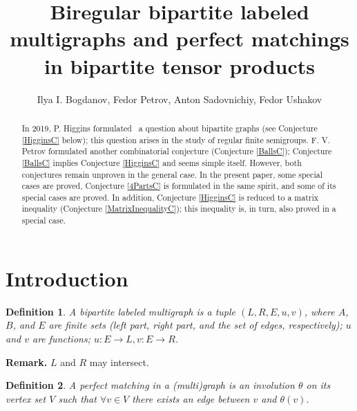 \documentclass[12pt]{article}
\theoremstyle{definition}
\theoremstyle{plain}
\newtheorem{definition}{Definition}[section]
\begin{document}
\newcommand{\eps}{\varepsilon}
\renewcommand{\phi}{\varphi}


\newcommand{\suchthat}{\, : \,}
\newcommand{\commentDK}[1]{{\color{blue}{#1 -- DK}}}
\newcommand{\dima}[1]{\commentDK{#1}}  
\newcommand{\fedya}[1]{{\color{orange}{#1 -- FP}}}
\newcommand{\red}[1]{{\color{red}{#1}}}
\newcommand{\green}[1]{{\color{green}{#1}}}



\author{Ilya I. Bogdanov, Fedor Petrov, Anton Sadovnichiy, Fedor Ushakov}
\title{Biregular bipartite labeled multigraphs and perfect matchings in bipartite tensor products}
\maketitle
\begin{abstract}

In 2019, P. Higgins formulated~\cite{H} a question about bipartite
graphs (see Conjecture \ref{HigginsC} below); this question arises in the study of regular
finite semigroups. F. V. Petrov formulated \cite{P}
another combinatorial conjecture
(Conjecture \ref{BallsC}); Conjecture \ref{BallsC} implies Conjecture \ref{HigginsC} and seems simple itself. However, both conjectures remain
unproven in the general case. In the present paper, some special cases are proved,
 Conjecture \ref{4PartsC} is formulated in the same spirit, and some of its special cases are proved. In addition,
Conjecture \ref{HigginsC} is reduced to a matrix inequality
(Conjecture \ref{MatrixInequalityC}); this inequality is, in turn, also proved in a special case.

\end{abstract}

\section{Introduction}

\begin{definition}
    A bipartite labeled multigraph is a tuple $(L,R,E,u,v)$, where $A$, $B$, and $E$ are finite sets (left part, right part, and the set of edges, respectively); $u$ and $v$ are functions; $u: E \rightarrow L, v : E \rightarrow R$.
\end{definition}

\textbf{Remark.} $L$ and $R$ may intersect.

\begin{definition}
A \emph{perfect matching} in a (multi)graph is an involution $\theta$ on its vertex set $V$ such that $\forall v \in V$ there exists an edge between $v$ and $\theta(v)$. 
\end{definition}
\end{document}
